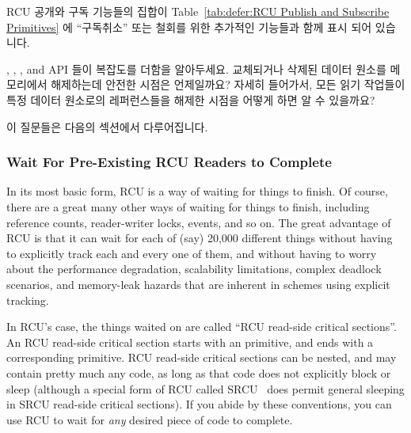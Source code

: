 RCU 공개와 구독 기능들의 집합이
Table~\ref{tab:defer:RCU Publish and Subscribe Primitives} 에 ``구독취소'' 또는
철회를 위한 추가적인 기능들과 함께 표시 되어 있습니다.

, ,
, and 
API 들이 복잡도를 더함을 알아두세요.
교체되거나 삭제된 데이터 원소를 메모리에서 해제하는데 안전한 시점은 언제일까요?
자세히 들어가서, 모든 읽기 작업들이 특정 데이터 원소로의 레퍼런스들을
해제한 시점을 어떻게 하면 알 수 있을까요?

이 질문들은 다음의 섹션에서 다루어집니다.

\subsubsection{Wait For Pre-Existing RCU Readers to Complete}
\label{sec:defer:Wait For Pre-Existing RCU Readers to Complete}

In its most basic form, RCU is a way of waiting for things to finish.
Of course, there are a great many other ways of waiting for things to
finish, including reference counts, reader-writer locks, events, and so on.
The great advantage of RCU is that it can wait for each of
(say) 20,000 different things without having to explicitly
track each and every one of them, and without having to worry about
the performance degradation, scalability limitations, complex deadlock
scenarios, and memory-leak hazards that are inherent in schemes
using explicit tracking.

In RCU's case, the things waited on are called
``RCU read-side critical sections''.
An RCU read-side critical section starts with an
 primitive, and ends with a corresponding
 primitive.
RCU read-side critical sections can be nested, and may contain pretty
much any code, as long as that code does not explicitly block or sleep
(although a special form of RCU called SRCU~\cite{PaulEMcKenney2006c}
does permit general sleeping in SRCU read-side critical sections).
If you abide by these conventions, you can use RCU to wait for \emph{any}
desired piece of code to complete.

